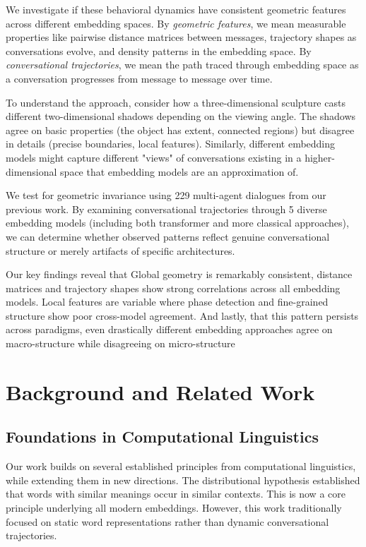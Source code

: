 \documentclass[11pt,letterpaper]{article}
\newcommand{\totalConversations}{229}
\newcommand{\numEmbeddingModels}{5}
\begin{document}
We investigate if these behavioral dynamics have consistent geometric features across different embedding spaces. By \textit{geometric features}, we mean measurable properties like pairwise distance matrices between messages, trajectory shapes as conversations evolve, and density patterns in the embedding space. By \textit{conversational trajectories}, we mean the path traced through embedding space as a conversation progresses from message to message over time.

To understand the approach, consider how a three-dimensional sculpture casts different two-dimensional shadows depending on the viewing angle. The shadows agree on basic properties (the object has extent, connected regions) but disagree in details (precise boundaries, local features). Similarly, different embedding models might capture different "views" of conversations existing in a higher-dimensional space that embedding models are an approximation of.

We test for geometric invariance using \totalConversations{} multi-agent dialogues from our previous work. By examining conversational trajectories through \numEmbeddingModels{} diverse embedding models (including both transformer and more classical approaches), we can determine whether observed patterns reflect genuine conversational structure or merely artifacts of specific architectures.

Our key findings reveal that Global geometry is remarkably consistent, distance matrices and trajectory shapes show strong correlations across all embedding models. Local features are variable where phase detection and fine-grained structure show poor cross-model agreement. And lastly, that this pattern persists across paradigms, even drastically different embedding approaches agree on macro-structure while disagreeing on micro-structure

\section{Background and Related Work}

\subsection{Foundations in Computational Linguistics}

Our work builds on several established principles from computational linguistics, while extending them in new directions. The distributional hypothesis \citep{harris1954distributional, firth1957papers} established that words with similar meanings occur in similar contexts. This is now a core principle underlying all modern embeddings. However, this work traditionally focused on static word representations rather than dynamic conversational trajectories.
\end{document}
